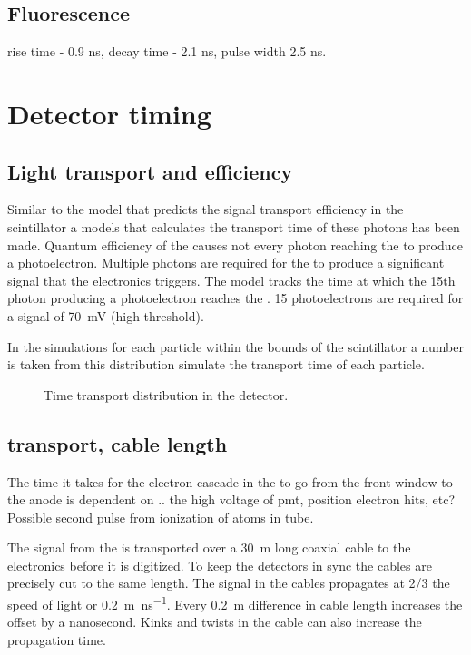 \subsection{Fluorescence}

rise time - 0.9 ns, decay time - 2.1 ns, pulse width 2.5 ns.



\section{Detector timing}


\subsection{Light transport and \pmt efficiency}

Similar to the model that predicts the signal transport efficiency in
the scintillator a models that calculates the transport time of these
photons has been made. Quantum efficiency of the \pmt causes not every
photon reaching the \pmt to produce a photoelectron. Multiple photons
are required for the \pmt to produce a significant signal that the
\hisparc electronics triggers. The model tracks the time at which the
15th photon producing a photoelectron reaches the \pmt. 15
photoelectrons are required for a signal of \SI{70}{\milli\volt} (high
threshold).

In the simulations for each particle within the bounds of the
scintillator a number is taken from this distribution simulate the
transport time of each particle.

\begin{figure}
    \centering
    
    \caption{ Time transport
             distribution in the detector.}
    \label{fig:transport_time}
\end{figure}


\subsection{\pmt transport, cable length}

The time it takes for the electron cascade in the \pmt to go from the
front window to the anode is dependent on .. the high voltage of pmt,
position electron hits, etc? Possible second pulse from ionization of
atoms in tube.

The signal from the \pmt is transported over a \SI{30}{\meter} long
coaxial cable to the \hisparc electronics before it is digitized. To
keep the detectors in sync the cables are precisely cut to the
same length. The signal in the cables propagates at 2/3 the speed of
light or \SI{.2}{\meter\per\ns}. Every \SI{.2}{\meter}
difference in cable length increases the offset by a nanosecond. Kinks
and twists in the cable can also increase the propagation time.

